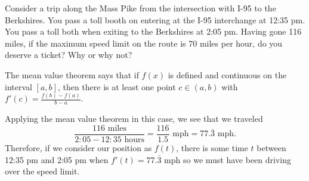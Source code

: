 \documentclass{ximera}
\author{Emma Smith Zbarsky}
\begin{document}
\begin{exercise}

Consider a trip along the Mass Pike from the intersection with I-95 to
the Berkshires. You pass a toll booth on entering at the I-95
interchange at 12:35 pm. You pass a toll both when exiting to the
Berkshires at 2:05 pm. Having gone 116 miles, if the maximum speed limit
on the route is 70 miles per hour, do you deserve a ticket? Why or why
not?


\begin{hint}
The mean value theorem says that if $f(x)$ is defined and continuous on
the interval $[a,b]$, then there is at least one point $c \in (a,b)$
with $f'(c) = \frac{f(b)-f(a)}{b-a}.$
\end{hint}


\begin{hint}
Applying the mean value theorem in this case, we see that we traveled
\[\frac{116 \mbox{ miles}}{2:05-12:35 \mbox{ hours}} = \frac{116}{1.5} \mbox{ mph} = 77.\overline{3} \mbox{ mph}.\]
Therefore, if we consider our position as $f(t)$, there is some time $t$
between 12:35 pm and 2:05 pm when $f'(t) = 77.\overline{3}$ mph so we
must have been driving over the speed limit.
\end{hint}


\begin{multipleChoice}
\end{multipleChoice}

\end{exercise}
\end{document}

